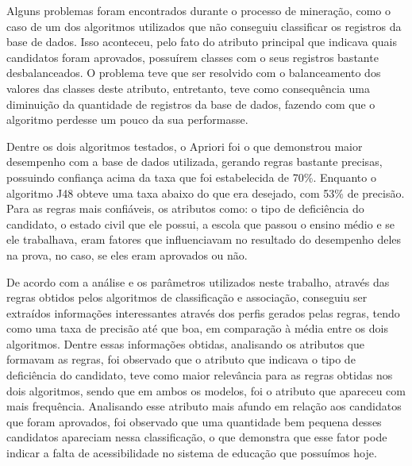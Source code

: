\par
Alguns problemas foram encontrados durante o processo de mineração, como o caso de um dos algoritmos utilizados que não conseguiu classificar os registros da base de dados.  Isso aconteceu, pelo fato do atributo principal que indicava quais candidatos foram aprovados, possuírem classes com o seus registros bastante desbalanceados. O problema teve que ser resolvido com o balanceamento dos valores das classes deste atributo, entretanto, teve como consequência uma diminuição da quantidade de registros da base de dados, fazendo com que o algoritmo perdesse um pouco da sua performasse.

\par
Dentre os dois algoritmos testados, o Apriori foi o que demonstrou maior desempenho com a base de dados utilizada, gerando regras bastante precisas, possuindo confiança acima da taxa que foi estabelecida de 70\%. Enquanto o algoritmo J48 obteve uma taxa abaixo do que era desejado, com 53\% de precisão. Para as regras mais confiáveis, os atributos como: o tipo de deficiência do candidato, o estado civil que ele possui, a escola que passou o ensino médio e se ele trabalhava, eram fatores que influenciavam no resultado do desempenho deles na prova, no caso, se eles eram aprovados ou não.  

\par
De acordo com a análise e os parâmetros utilizados neste trabalho, através das regras obtidos pelos algoritmos de classificação e associação, conseguiu ser extraídos informações interessantes através dos perfis gerados pelas regras, tendo como uma taxa de precisão até que boa, em comparação à média entre os dois algoritmos. Dentre essas informações obtidas, analisando os atributos que formavam as regras, foi observado que o atributo que indicava o tipo de deficiência do candidato, teve como maior relevância para as regras obtidas nos dois algoritmos, sendo que em ambos os modelos, foi o atributo que apareceu com mais frequência. Analisando esse atributo mais afundo em relação aos candidatos que foram aprovados, foi observado que uma quantidade bem pequena desses candidatos apareciam nessa classificação, o que demonstra que esse fator pode indicar a falta de acessibilidade no sistema de educação que possuímos hoje.



